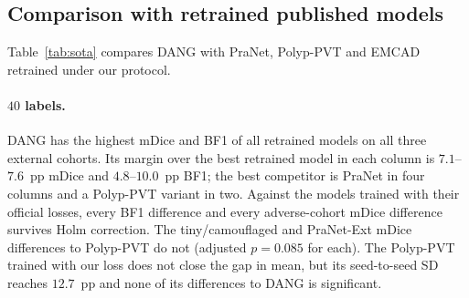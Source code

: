 \documentclass[10pt,twocolumn]{article}
\begin{document}
\begin{table}[!t]
{%
  }
\end{table}

\subsection{Comparison with retrained published models}
\label{sec:sota}
Table~\ref{tab:sota} compares DANG with PraNet, Polyp-PVT and EMCAD retrained under our protocol.

\paragraph{$40$ labels.} DANG has the highest mDice and BF1 of all retrained models on all three external cohorts. Its margin over the best retrained model in each column is $7.1$--$7.6$~pp mDice and $4.8$--$10.0$~pp BF1; the best competitor is PraNet in four columns and a Polyp-PVT variant in two. Against the models trained with their official losses, every BF1 difference and every adverse-cohort mDice difference survives Holm correction. The tiny/camouflaged and PraNet-Ext mDice differences to Polyp-PVT do not (adjusted $p=0.085$ for each). The Polyp-PVT trained with our loss does not close the gap in mean, but its seed-to-seed SD reaches $12.7$~pp and none of its differences to DANG is significant.
\end{document}
